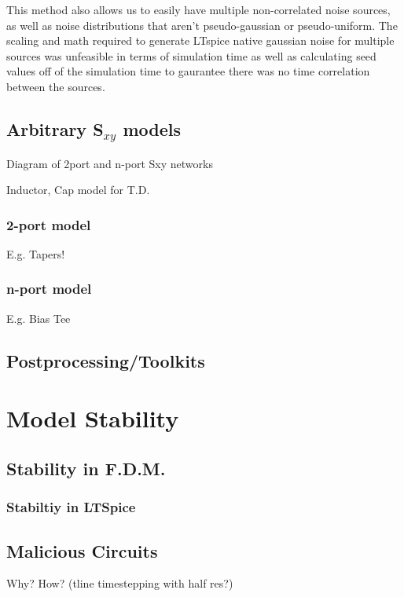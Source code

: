 \documentclass{article}
\begin{document}
This method also allows us to easily have multiple non-correlated noise sources, as well as noise 
distributions that aren't pseudo-gaussian or pseudo-uniform. The scaling and math required to generate
LTspice native gaussian noise for multiple sources was unfeasible in terms of simulation time as well
as calculating seed values off of the simulation time to gaurantee there was no time correlation between
the sources.


\subsection{Arbitrary S$_{xy}$ models}

Diagram of 2port and n-port Sxy networks

Inductor, Cap model for T.D.

\subsubsection{2-port model}

E.g. Tapers!

\subsubsection{n-port model}

E.g. Bias Tee

\subsection{Postprocessing/Toolkits}

\section{Model Stability}

\subsection{Stability in F.D.M.}

\subsubsection{Stabiltiy in LTSpice}

\subsection{Malicious Circuits}

Why? How? (tline timestepping with half res?)
\end{document}
